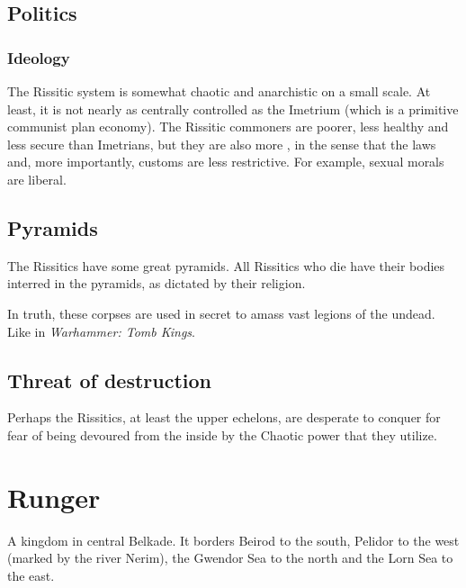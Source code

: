 \subsection{Politics}
\subsubsection{Ideology}
The Rissitic system is somewhat chaotic and anarchistic on a small scale. 
At least, it is not nearly as centrally controlled as the Imetrium (which is a primitive communist plan economy). 
The Rissitic commoners are poorer, less healthy and less secure than Imetrians, but they are also more , in the sense that the laws and, more importantly, customs are less restrictive. 
For example, sexual morals are liberal. 









\subsection{Pyramids}
\label{Rissitic pyramids}
The Rissitics have some great pyramids. All Rissitics who die have their bodies interred in the pyramids, as dictated by their religion. 

In truth, these corpses are used in secret to amass vast legions of the undead. Like in \emph{Warhammer: Tomb Kings}. 







\subsection{Threat of destruction}
Perhaps the Rissitics, at least the upper echelons, are desperate to conquer for fear of being devoured from the inside by the Chaotic power that they utilize. 
















\section{Runger}
\label{Runger}
A kingdom in central Belkade. It borders Beirod to the south, Pelidor to the west (marked by the river Nerim), the Gwendor Sea to the north and the Lorn Sea to the east. 

